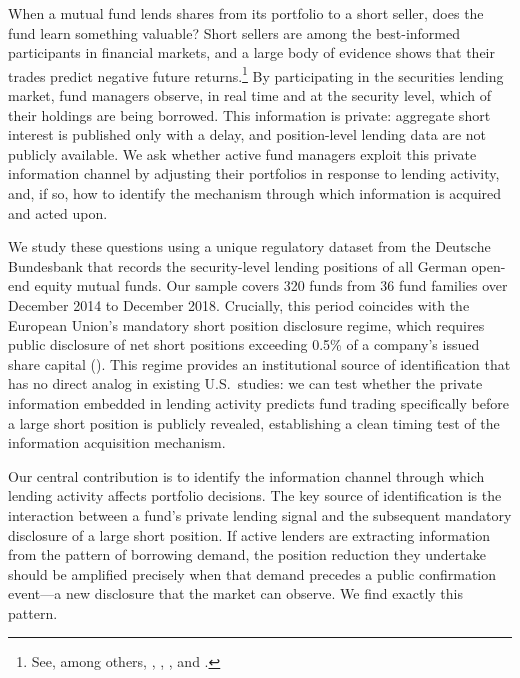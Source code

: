 
When a mutual fund lends shares from its portfolio to a short seller, does the fund learn something valuable?  Short sellers are among the best-informed participants in financial markets, and a large body of evidence shows that their trades predict negative future returns.\footnote{See, among others, \cite{diamond_verrecchia:87}, \cite{boehmer_jones_zhang:08}, \cite{engelberg_reed_ringgenberg:2012}, and \cite{karpoff_lou:10}.}  By participating in the securities lending market, fund managers observe, in real time and at the security level, which of their holdings are being borrowed.  This information is private: aggregate short interest is published only with a delay, and position-level lending data are not publicly available.  We ask whether active fund managers exploit this private information channel by adjusting their portfolios in response to lending activity, and, if so, how to identify the mechanism through which information is acquired and acted upon.

We study these questions using a unique regulatory dataset from the Deutsche Bundesbank that records the security-level lending positions of all German open-end equity mutual funds.  Our sample covers 320 funds from 36 fund families over December 2014 to December 2018.  Crucially, this period coincides with the European Union's mandatory short position disclosure regime, which requires public disclosure of net short positions exceeding 0.5\% of a company's issued share capital (\citealp{jank_smajlbegovic:2015, jank_roling_smajlbegovic2020}).  This regime provides an institutional source of identification that has no direct analog in existing U.S.\ studies: we can test whether the private information embedded in lending activity predicts fund trading specifically before a large short position is publicly revealed, establishing a clean timing test of the information acquisition mechanism.

Our central contribution is to identify the information channel through which lending activity affects portfolio decisions.  The key source of identification is the interaction between a fund's private lending signal and the subsequent mandatory disclosure of a large short position.  If active lenders are extracting information from the pattern of borrowing demand, the position reduction they undertake should be amplified precisely when that demand precedes a public confirmation event---a new disclosure that the market can observe.  We find exactly this pattern.

